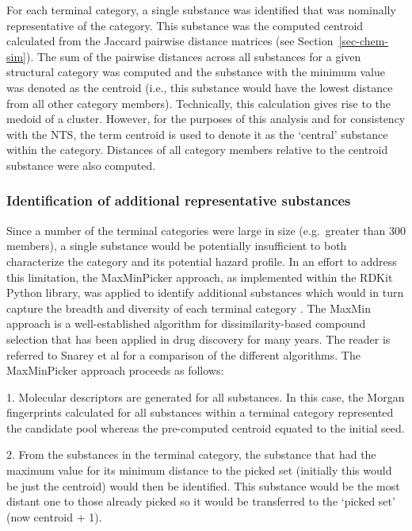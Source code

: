 \documentclass[
  super,
  preprint,
  3p]{elsarticle}
\begin{document}
For each terminal category, a single substance was identified that was
nominally representative of the category. This substance was the
computed centroid calculated from the Jaccard pairwise distance matrices
(see Section~\ref{sec-chem-sim}). The sum of the pairwise distances
across all substances for a given structural category was computed and
the substance with the minimum value was denoted as the centroid (i.e.,
this substance would have the lowest distance from all other category
members). Technically, this calculation gives rise to the medoid of a
cluster. However, for the purposes of this analysis and for consistency
with the NTS, the term centroid is used to denote it as the `central'
substance within the category. Distances of all category members
relative to the centroid substance were also computed.

\hypertarget{sec-maxmin}{%
\subsubsection{Identification of additional representative
substances}\label{sec-maxmin}}

Since a number of the terminal categories were large in size
(e.g.~greater than 300 members), a single substance would be potentially
insufficient to both characterize the category and its potential hazard
profile. In an effort to address this limitation, the MaxMinPicker
approach, as implemented within the RDKit Python library, was applied to
identify additional substances which would in turn capture the breadth
and diversity of each terminal category
\citep{ashton_identification_2002}. The MaxMin approach is a
well-established algorithm for dissimilarity-based compound selection
that has been applied in drug discovery for many years. The reader is
referred to Snarey et al \citep{snarey_comparison_1997} for a comparison
of the different algorithms. The MaxMinPicker approach proceeds as
follows:

1. Molecular descriptors are generated for all substances. In this case,
the Morgan fingerprints calculated for all substances within a terminal
category represented the candidate pool whereas the pre-computed
centroid equated to the initial seed.

2. From the substances in the terminal category, the substance that had
the maximum value for its minimum distance to the picked set (initially
this would be just the centroid) would then be identified. This
substance would be the most distant one to those already picked so it
would be transferred to the `picked set' (now centroid + 1).
\end{document}

